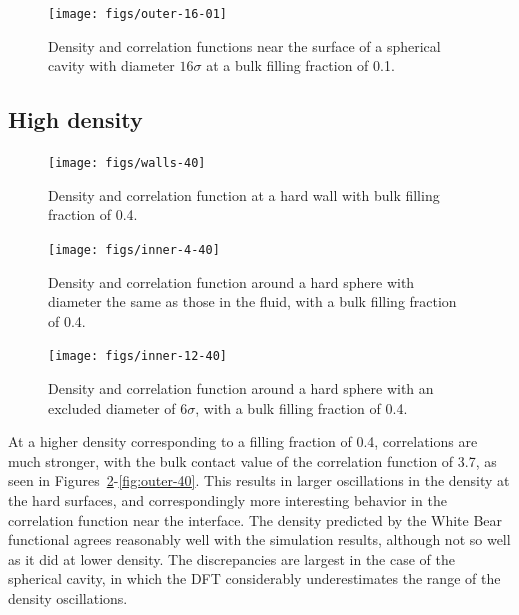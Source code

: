 \documentclass[letterpaper,twocolumn,amsmath,amssymb,jcp,10pt,aip]{revtex4-1}
\begin{document}
\begin{figure}
  \texttt{[image: figs/outer-16-01]}
  \caption{Density and correlation functions near the surface of a
    spherical cavity with diameter $16\sigma$ at a bulk filling
    fraction of 0.1.}
  \label{fig:outer-10}
\end{figure}





\subsection{High density}

\begin{figure}
  \texttt{[image: figs/walls-40]}
  \caption{Density and correlation function at a hard wall with bulk
    filling fraction of 0.4.}
  \label{fig:walls-40}
\end{figure}

\begin{figure}
  \texttt{[image: figs/inner-4-40]}
  \caption{Density and correlation function around a hard sphere with
    diameter the same as those in the fluid, with a bulk filling
    fraction of 0.4.}
  \label{fig:inner-4-40}
\end{figure}

\begin{figure}
  \texttt{[image: figs/inner-12-40]}
  \caption{Density and correlation function around a hard sphere with
    an excluded diameter of $6\sigma$, with a bulk filling fraction of
    0.4.}
  \label{fig:inner-12-40}
\end{figure}

At a higher density corresponding to a filling fraction of 0.4,
correlations are much stronger, with the bulk contact value of the
correlation function of 3.7, as seen in
Figures~\ref{fig:walls-40}-\ref{fig:outer-40}.  This results in larger
oscillations in the density at the hard surfaces, and correspondingly
more interesting behavior in the correlation function near the
interface.  The density predicted by the White Bear functional agrees
reasonably well with the simulation results, although not so well as
it did at lower density.  The discrepancies are largest in the case of
the spherical cavity, in which the DFT considerably underestimates the
range of the density oscillations.
\end{document}
